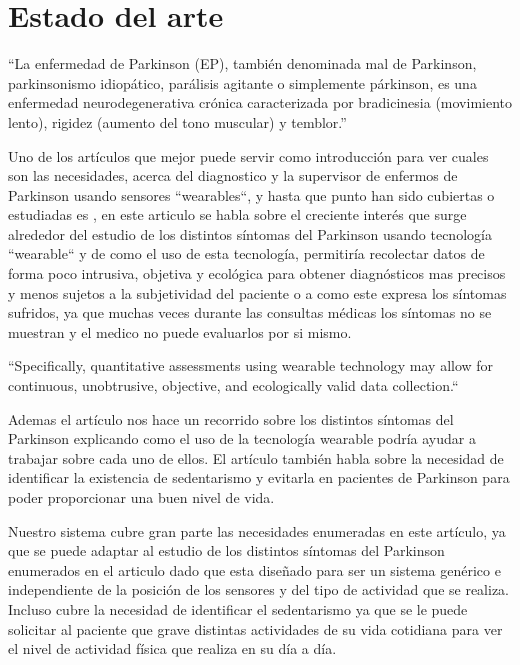 \documentclass[11pt,spanish]{article}
\begin{document}
\section{Estado del arte}

“La enfermedad de Parkinson (EP), también denominada mal de Parkinson, parkinsonismo idiopático, parálisis agitante o simplemente párkinson, es una enfermedad neurodegenerativa crónica caracterizada por bradicinesia (movimiento lento), rigidez (aumento del tono muscular) y temblor.” \cite{Wikipedia} 
\newline

Uno de los artículos que mejor puede servir como introducción para ver cuales son las necesidades, acerca del diagnostico y la supervisor de enfermos de Parkinson usando sensores ``wearables``, y hasta que punto han sido cubiertas o estudiadas es \cite{resumen2}, en este articulo se habla sobre el creciente interés que surge alrededor del estudio de los distintos síntomas del Parkinson usando tecnología ``wearable`` y de como el uso de esta tecnología, permitiría recolectar datos de forma poco intrusiva, objetiva y ecológica para obtener diagnósticos mas precisos y menos sujetos a la subjetividad del paciente o a como este expresa los síntomas sufridos, ya que muchas veces durante las consultas médicas los síntomas no se muestran y el medico no puede evaluarlos por si mismo.
\newline

``Specifically, quantitative assessments using wearable technology may allow for continuous, unobtrusive, objective, and ecologically valid data collection.``
\newline

Ademas el artículo nos hace un recorrido sobre los distintos síntomas del Parkinson explicando como el uso de la tecnología wearable podría ayudar a trabajar sobre cada uno de ellos. El artículo también habla sobre la necesidad de identificar la existencia de sedentarismo y evitarla en pacientes de Parkinson para poder proporcionar una buen nivel de vida.
\newline

Nuestro sistema cubre gran parte las necesidades enumeradas en este artículo, ya que se puede adaptar al estudio de los distintos síntomas del Parkinson enumerados en el articulo dado que esta diseñado para ser un sistema genérico e independiente de la posición de los sensores y del tipo de actividad que se realiza. Incluso cubre la necesidad de identificar el sedentarismo ya que se le puede solicitar al paciente que grave distintas actividades de su vida cotidiana para ver el nivel de actividad física que realiza en su día a día.
\newline
\end{document}
